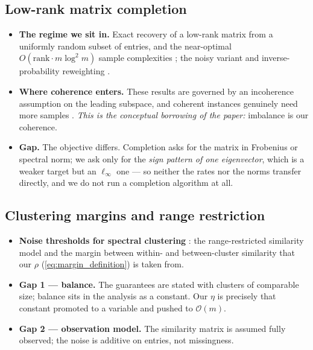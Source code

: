 \subsection*{Low-rank matrix completion}
\begin{itemize}[leftmargin=1.4em, itemsep=3pt, topsep=2pt]
  \item \textbf{The regime we sit in.} Exact recovery of a low-rank matrix from a
        uniformly random subset of entries, and the near-optimal
        $O(\mathrm{rank}\cdot m\log^2 m)$ sample complexities
        \cite{candes2008exact, candes2009power, recht2011simpler}; the noisy
        variant and inverse-probability reweighting
        \cite{candes2009matrix}.
  \item \textbf{Where coherence enters.} These results are governed by an
        incoherence assumption on the leading subspace, and coherent instances
        genuinely need more samples \cite{chen2014completing}. \emph{This is the
        conceptual borrowing of the paper:} imbalance is our coherence.
  \item \textbf{Gap.} The objective differs. Completion asks for the matrix in
        Frobenius or spectral norm; we ask only for the \emph{sign pattern of one
        eigenvector}, which is a weaker target but an $\ell_\infty$ one --- so
        neither the rates nor the norms transfer directly, and we do not run a
        completion algorithm at all.
\end{itemize}

\subsection*{Clustering margins and range restriction}
\begin{itemize}[leftmargin=1.4em, itemsep=3pt, topsep=2pt]
  \item \textbf{Noise thresholds for spectral clustering}
        \cite{Balakrishnan2011clustering}: the range-restricted similarity model
        and the margin between within- and between-cluster similarity that our
        $\rho$ (\eqref{eq:margin_definition}) is taken from.
  \item \textbf{Gap 1 --- balance.} The guarantees are stated with clusters of
        comparable size; balance sits in the analysis as a constant. Our $\eta$ is
        precisely that constant promoted to a variable and pushed to
        $\mathcal O(m)$.
  \item \textbf{Gap 2 --- observation model.} The similarity matrix is assumed
        fully observed; the noise is additive on entries, not missingness.
\end{itemize}

